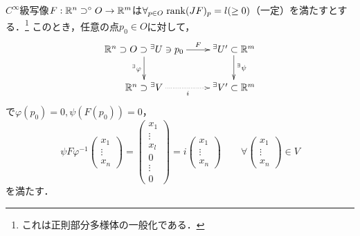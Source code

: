 \documentclass[uplatex,dvipdfmx]{jsreport}
\begin{document}
\begin{theorem}
    $C^\infty$級写像$F:\mathbb{R}^n\supset^\circ O\to\mathbb{R}^m$は$\forall_{p\in O}\;\mathrm{rank}(JF)_p=l(\ge 0)$（一定）を満たすとする．\footnote{これは正則部分多様体の一般化である．}
    このとき，任意の点$p_0\in O$に対して，
    \[\xymatrix{
        \R^n\supset O\supset{}^\exists U\ni p_0\ar[r]^-{F}\ar[d]_-{{}^\exists\varphi}&{}^\exists U'\subset\R^m\ar[d]^-{{}^\exists\psi}\\
        \R^n\supset{}^\exists V\ar@{.>}[r]_-{i}&{}^\exists V'\subset\R^m
    }\]
    で$\varphi(p_0)=0,\psi(F(p_0))=0$，
    \[\psi F\varphi^{-1}\begin{pmatrix}x_1\\\vdots\\x_n\end{pmatrix}=\begin{pmatrix}x_1\\\vdots\\x_l\\0\\\vdots\\0\end{pmatrix}=i\begin{pmatrix}x_1\\\vdots\\x_n\end{pmatrix}\qquad\forall\begin{pmatrix}x_1\\\vdots\\x_n\end{pmatrix}\in V\]
    を満たす．
\end{theorem}
\end{document}
